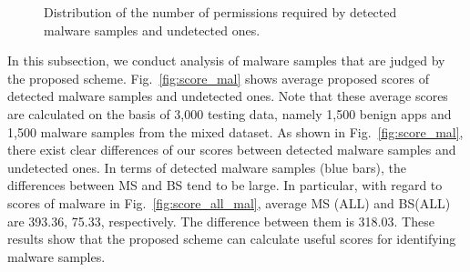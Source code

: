 \documentclass{ieeeaccess}
\newcommand{\myfigurename}{Fig.}
\begin{document}
\begin{figure}[t]
{  } 
  \caption{Distribution of the number of permissions required by detected malware samples and undetected ones.}
  \label{fig:permission_distribution_mal}
\end{figure}
In this subsection, we conduct analysis of malware samples that are judged by the proposed scheme.
\myfigurename~\ref{fig:score_mal} shows average proposed scores of detected malware samples and undetected ones.
Note that these average scores are calculated on the basis of 3,000 testing data, namely 1,500 benign apps and 1,500 malware samples from the mixed dataset.
As shown in \myfigurename~\ref{fig:score_mal}, there exist clear differences of our scores between detected malware samples and undetected ones.
In terms of detected malware samples (blue bars), the differences between MS and BS tend to be large. 
In particular, with regard to scores of malware in \myfigurename~\ref{fig:score_all_mal}, average MS (ALL) and BS(ALL) are 393.36, 75.33, respectively.
The difference between them is 318.03.
These results show that the proposed scheme can calculate useful scores for identifying malware samples.
\end{document}
